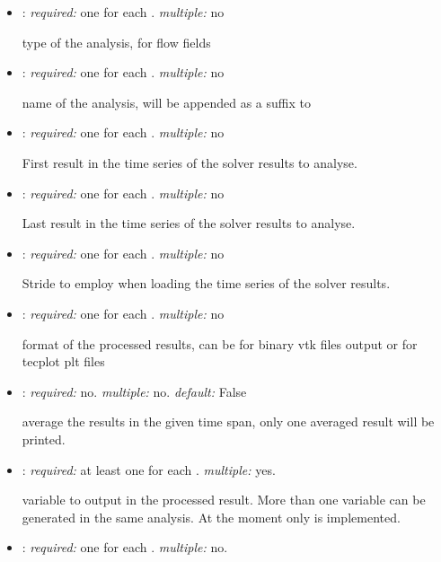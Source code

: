 \begin{itemize}
\item {}: \textit{required:} one for each . \textit{multiple:} no

type of the analysis,  for flow fields

\item {}: \textit{required:} one for each . \textit{multiple:} no

name of the analysis, will be appended as a suffix to 

\item {}: \textit{required:} one for each . \textit{multiple:} no

First result in the time series of the solver results to analyse.

\item {}: \textit{required:} one for each . \textit{multiple:} no

Last result in the time series of the solver results to analyse.

\item {}: \textit{required:} one for each . \textit{multiple:} no

Stride to employ when loading the time series of the solver results. 

\item {}: \textit{required:} one for each . \textit{multiple:} no

format of the processed results, can be  for binary vtk files output or  for tecplot plt files

\item {}: \textit{required:} no. \textit{multiple:} no. \textit{default:} False

average the results in the given time span, only one averaged result will be printed. 

\item {}: \textit{required:} at least one for each . \textit{multiple:} yes.

variable to output in the processed result. More than one variable can be generated in the same analysis. At the moment only  is implemented.

\item {}: \textit{required:} one for each . \textit{multiple:} no.


\end{itemize}

